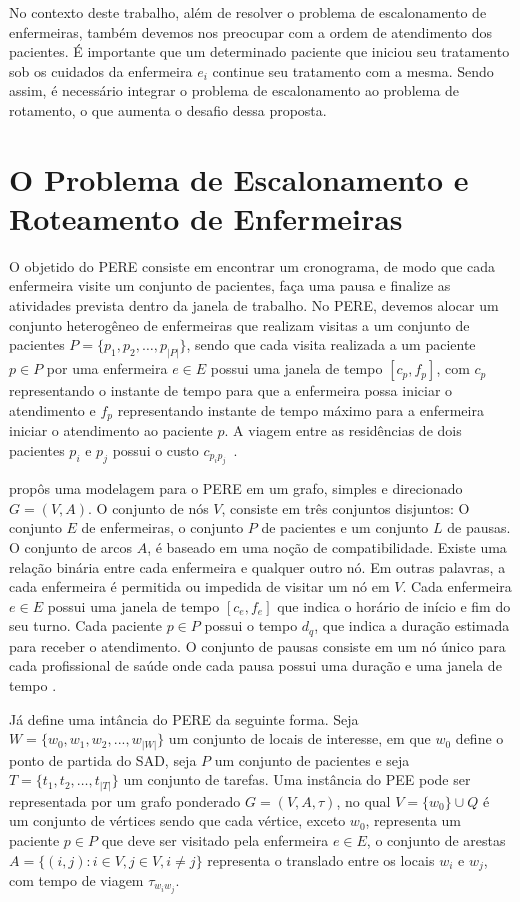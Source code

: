 No contexto deste trabalho, al\'em de resolver o problema de escalonamento de enfermeiras, tamb\'em devemos nos preocupar com a ordem de atendimento dos pacientes. \'E importante que um determinado paciente que iniciou seu tratamento sob os cuidados da enfermeira $e_i$ continue seu tratamento com a mesma. Sendo assim, \'e necess\'ario integrar o problema de escalonamento ao problema de rotamento, o que aumenta o desafio dessa proposta.

\section{O Problema de Escalonamento e Roteamento de Enfermeiras}

O objetido do \ac{PERE} consiste em  encontrar um cronograma, de modo que cada enfermeira visite um conjunto de pacientes, faça uma pausa e finalize as atividades prevista dentro da janela de trabalho. No \ac{PERE}, devemos alocar um conjunto heterogêneo de enfermeiras  que realizam visitas a um conjunto de pacientes  $P = \{ p_1, p_2, \ldots, p_{|P|} \}$, sendo que cada visita realizada a um paciente $p \in P$ por uma enfermeira $e \in E$ possui uma janela de tempo $[c_{p}, f_{p}]$, com $c_{p}$ representando o instante de tempo para que a enfermeira possa iniciar o atendimento e $f_{p}$ representando instante de tempo m\'aximo para a enfermeira iniciar o atendimento ao paciente $p$. A viagem entre as residências de dois pacientes $p_i$ e $p_j$  possui o custo $c_{p_ip_j}$~\cite{rasmussenm:2012}.   

\cite{cheng:98} prop\^os uma modelagem para o \ac{PERE} em um grafo, simples e direcionado $G = (V,A)$. O conjunto de nós $V$, consiste em três conjuntos disjuntos: O conjunto $E$ de enfermeiras, o conjunto $P$ de pacientes e um conjunto $L$ de pausas. O conjunto de arcos $A$, é baseado em uma noção de compatibilidade. Existe uma relação binária entre cada enfermeira e qualquer outro nó. Em outras palavras, a cada enfermeira é permitida ou impedida de visitar um nó em $V$. Cada enfermeira $e \in E$ possui uma janela de tempo $[c_e, f_e]$ que indica o horário de início e fim do seu turno.  Cada paciente $p \in P$ possui o tempo $d_q$, que indica a duraç\~ao estimada para receber o atendimento. O conjunto de pausas consiste em um nó único para cada profissional de saúde onde cada pausa possui uma duração e uma janela de tempo \cite{cheng:98}.

J\'a \cite{mansini:2016} define uma int\^ancia do \ac{PERE} da seguinte forma. Seja $W = \{w_0, w_1, w_2, ..., w_{|W|}\}$ um conjunto de locais de interesse, em que $w_0$ define o ponto de partida do \ac{SAD}, seja $P$ um conjunto de pacientes e seja $T = \{ t_1, t_2, \ldots, t_{|T|}\}$ um conjunto de tarefas.  
Uma inst\^ancia do \ac{PEE} pode ser representada por um grafo ponderado $G = (V, A,\tau)$, no qual $V = \{w_0\} \cup Q$ é um conjunto de vértices sendo que cada vértice, exceto $w_0$, representa um paciente $p\in P$ que deve ser visitado pela enfermeira $e\in E$, o conjunto de arestas $A = \{ (i,j): i \in V, j \in V, i \neq j \}$ representa o translado entre os locais $w_i$ e $w_j$, com tempo de viagem $\tau_{w_iw_j}$. 

